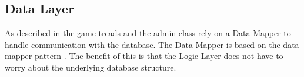 





\subsection{Data Layer}
As described in  the game treads and the admin class rely on a Data Mapper to handle communication with the database. The Data Mapper is based on the data mapper pattern \cite{fowler}. The benefit of this is that the Logic Layer does not have to worry about the underlying database structure.

